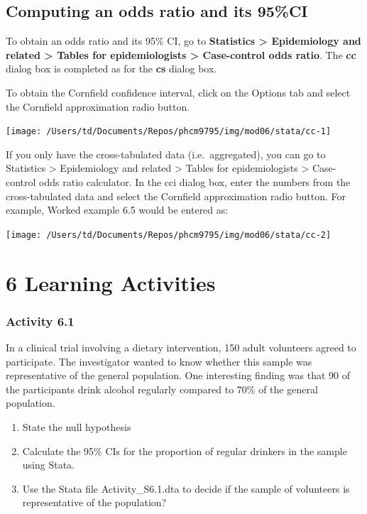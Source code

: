 \documentclass[
]{memoir}
\providecommand{\tightlist}{%
  \setlength{\itemsep}{0pt}\setlength{\parskip}{0pt}}
\begin{document}
\hypertarget{computing-an-odds-ratio-and-its-95ci}{%
\section{Computing an odds ratio and its 95\%CI}\label{computing-an-odds-ratio-and-its-95ci}}

To obtain an odds ratio and its 95\% CI, go to \textbf{Statistics \textgreater{} Epidemiology and related \textgreater{} Tables for epidemiologists \textgreater{} Case-control odds ratio}. The \textbf{cc} dialog box is completed as for the \textbf{cs} dialog box.

To obtain the Cornfield confidence interval, click on the Options tab and select the Cornfield approximation radio button.

\texttt{[image: /Users/td/Documents/Repos/phcm9795/img/mod06/stata/cc-1]}

If you only have the cross-tabulated data (i.e.~aggregated), you can go to Statistics \textgreater{} Epidemiology and related \textgreater{} Tables for epidemiologists \textgreater{} Case-control odds ratio calculator. In the cci dialog box, enter the numbers from the cross-tabulated data and select the Cornfield approximation radio button. For example, Worked example 6.5 would be entered as:

\texttt{[image: /Users/td/Documents/Repos/phcm9795/img/mod06/stata/cc-2]}

\hypertarget{learning-activities-5}{%
\chapter*{\texorpdfstring{\textbf{6} Learning Activities}{6 Learning Activities}}\label{learning-activities-5}}

\hypertarget{activity-6.1}{%
\subsection*{Activity 6.1}\label{activity-6.1}}

In a clinical trial involving a dietary intervention, 150 adult volunteers agreed to participate. The investigator wanted to know whether this sample was representative of the general population. One interesting finding was that 90 of the participants drink alcohol regularly compared to 70\% of the general population.

\begin{enumerate}
\def\labelenumi{\alph{enumi})}
\tightlist
\item
  State the null hypothesis
\item
  Calculate the 95\% CIs for the proportion of regular drinkers in the sample using Stata.
\item
  Use the Stata file Activity\_S6.1.dta to decide if the sample of volunteers is representative of the population?
\end{enumerate}
\end{document}
